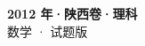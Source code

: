 \documentclass[zihao=-4, a4paper]{ctexart}
\begin{document}
\begin{center}
  {\Large\bfseries 2012 年·陕西卷·理科}\\[4pt]
  {\large 数学 · 试题版}
\end{center}
\medskip
{}

\end{document}
